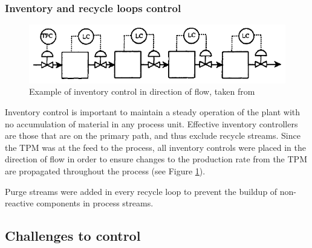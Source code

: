 \subsubsection{Inventory and recycle loops control}

\begin{figure}
    \centering
    \includegraphics[width=\linewidth]{chapters/4-operation-control/4-Figures/TPM-Price-1994.png}
    \caption{Example of inventory control in direction of flow, taken from \textcite{}}
    \label{fig:TPM}
\end{figure}
Inventory control is important to maintain a steady operation of the plant with no accumulation of material in any process unit. Effective inventory controllers are those that are on the primary path, and thus exclude recycle streams. Since the TPM was at the feed to the process, all inventory controls were placed in the direction of flow in order to ensure changes to the production rate from the TPM are propagated throughout the process (see Figure \ref{fig:TPM}). 

Purge streams were added in every recycle loop to prevent the buildup of non-reactive components in process streams.  



\subsection{Challenges to control}%

